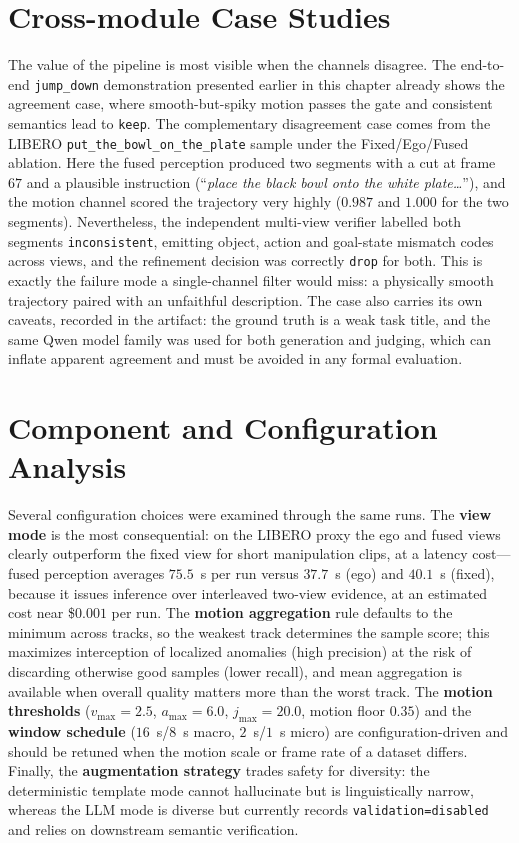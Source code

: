 \documentclass[11pt,oneside]{report}
\begin{document}
\section{Cross-module Case Studies}
The value of the pipeline is most visible when the channels disagree. The
end-to-end \texttt{jump\_down} demonstration presented earlier in this chapter
already shows the agreement case, where smooth-but-spiky motion passes the gate
and consistent semantics lead to \texttt{keep}. The complementary disagreement case comes from
the LIBERO \texttt{put\_the\_bowl\_on\_the\_plate} sample under the
Fixed/Ego/Fused ablation. Here the fused perception produced two segments with a
cut at frame $67$ and a plausible instruction (``\emph{place the black bowl onto
the white plate\dots}''), and the motion channel scored the trajectory very
highly ($0.987$ and $1.000$ for the two segments). Nevertheless, the independent
multi-view verifier labelled both segments \texttt{inconsistent}, emitting
object, action and goal-state mismatch codes across views, and the refinement
decision was correctly \texttt{drop} for both. This is exactly the
failure mode a single-channel filter would miss: a physically smooth trajectory
paired with an unfaithful description. The case also carries its own caveats,
recorded in the artifact: the ground truth is a weak task title, and the same
Qwen model family was used for both generation and judging, which can inflate
apparent agreement and must be avoided in any formal evaluation.

\section{Component and Configuration Analysis}
Several configuration choices were examined through the same runs. The
\textbf{view mode} is the most consequential: on the LIBERO proxy the ego and
fused views clearly outperform the fixed view for short manipulation clips, at a
latency cost---fused perception averages $75.5$~s per run versus $37.7$~s
(ego) and $40.1$~s (fixed), because it issues inference over interleaved
two-view evidence, at an estimated cost near \$$0.001$ per run. The
\textbf{motion aggregation} rule defaults to the minimum across tracks, so the
weakest track determines the sample score; this maximizes interception of
localized anomalies (high precision) at the risk of discarding otherwise good
samples (lower recall), and mean aggregation is available when overall quality
matters more than the worst track. The \textbf{motion thresholds}
($v_{\max}=2.5$, $a_{\max}=6.0$, $j_{\max}=20.0$, motion floor $0.35$) and the
\textbf{window schedule} ($16$~s/$8$~s macro, $2$~s/$1$~s micro) are
configuration-driven and should be retuned when the motion scale or frame rate
of a dataset differs. Finally, the \textbf{augmentation strategy} trades safety
for diversity: the deterministic template mode cannot hallucinate but is
linguistically narrow, whereas the LLM mode is diverse but currently records
\texttt{validation=disabled} and relies on downstream semantic verification.
\end{document}
